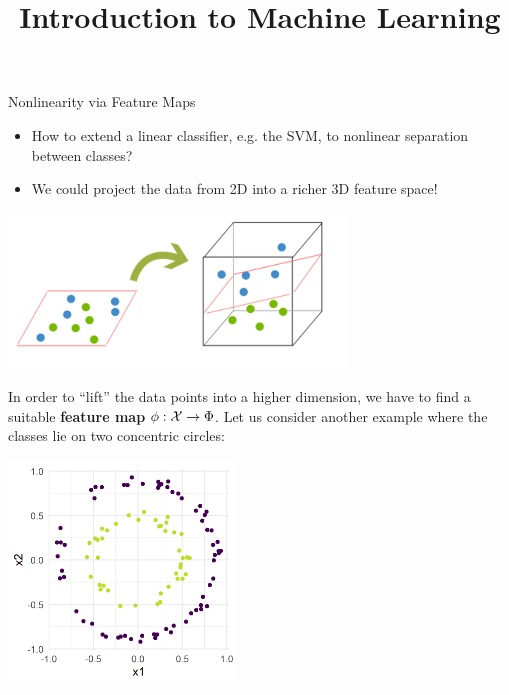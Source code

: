 \documentclass[11pt,compress,t,notes=noshow, xcolor=table]{beamer}
\title{Introduction to Machine Learning}
\date{}
\begin{document}


\begin{vbframe}{Nonlinearity via Feature Maps}
\begin{itemize}
\item How to extend a linear classifier, e.g. the SVM, to nonlinear separation between classes? 
\item We could project the data from 2D into a richer 3D feature space!
\end{itemize}

\vspace{1cm} 
\begin{center}
\includegraphics[width=9cm]{figure_man/kernels/svm_dummies_kernelling.PNG}
\end{center}

\framebreak 


  In order to \enquote{lift} the data points into a higher dimension, we have to find a suitable \textbf{feature map} $\phi : \mathcal{X} \to \Phi$.
Let us consider another example where the classes lie on two concentric circles:

\begin{center}
\includegraphics[width=6cm]{figure/circles_ds.png}
\end{center}

\framebreak


\end{vbframe}
\end{document}
